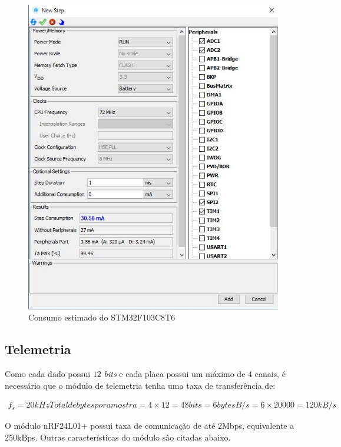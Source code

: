 \documentclass[
	12pt,				%
	openright,			%
	twoside,			%
	a4paper,			%
	english,			%
	french,				%
	spanish,			%
	brazil,				%
	]{abntex2}
\begin{document}
			\begin{figure}[!ht]
				\centering
				\includegraphics[scale = 0.6]{../Fotos/stmConsumo.jpg}
				\caption{Consumo estimado do STM32F103C8T6}
			\end{figure}


		\subsection{Telemetria}
			Como cada dado possui $12$ \textit{bits} e cada placa possui um
			máximo de 4 canais, é necessário que o módulo de telemetria
			tenha uma taxa de transferência de:

			\begin{gather*}
				f_s = 20kHz
				Total de bytes por amostra = 4\times 12 = 48 bits = 6 bytes
				B/s = 6\times 20000 = 120kB/s
			\end{gather*}

			O módulo nRF24L01+\cite{nrf} possui taxa de comunicação de até 2Mbps,
			equivalente a 250kBps. Outras características do módulo são
			citadas abaixo.
\end{document}
